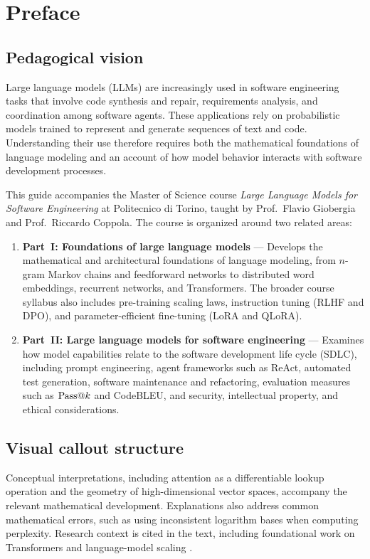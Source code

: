 \documentclass[../main.tex]{subfiles}
\begin{document}
\chapter*{Preface}

\section*{Pedagogical vision}
Large language models (LLMs) are increasingly used in software engineering tasks that involve code synthesis and repair, requirements analysis, and coordination among software agents. These applications rely on probabilistic models trained to represent and generate sequences of text and code. Understanding their use therefore requires both the mathematical foundations of language modeling and an account of how model behavior interacts with software development processes.

This guide accompanies the Master of Science course \emph{Large Language Models for Software Engineering} at Politecnico di Torino, taught by Prof.~Flavio Giobergia and Prof.~Riccardo Coppola. The course is organized around two related areas:
\begin{enumerate}
    \item \textbf{Part~I: Foundations of large language models} --- Develops the mathematical and architectural foundations of language modeling, from $n$-gram Markov chains and feedforward networks to distributed word embeddings, recurrent networks, and Transformers. The broader course syllabus also includes pre-training scaling laws, instruction tuning (RLHF and DPO), and parameter-efficient fine-tuning (LoRA and QLoRA).
    \item \textbf{Part~II: Large language models for software engineering} --- Examines how model capabilities relate to the software development life cycle (SDLC), including prompt engineering, agent frameworks such as ReAct, automated test generation, software maintenance and refactoring, evaluation measures such as $\mathrm{Pass}@k$ and CodeBLEU, and security, intellectual property, and ethical considerations.
\end{enumerate}

\section*{Visual callout structure}
Conceptual interpretations, including attention as a differentiable lookup operation and the geometry of high-dimensional vector spaces, accompany the relevant mathematical development. Explanations also address common mathematical errors, such as using inconsistent logarithm bases when computing perplexity. Research context is cited in the text, including foundational work on Transformers and language-model scaling \citep{vaswani2017,brown2020,hoffmann2022}.
\end{document}
